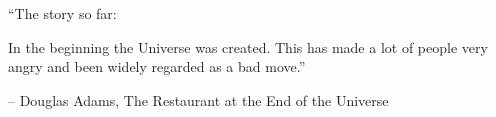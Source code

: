 \chapter*{}
%

{\it {``The story so far:

In the beginning the Universe was created.
This has made a lot of people very angry and been widely regarded as a bad move.'' }}

-- Douglas Adams, The Restaurant at the End of the Universe